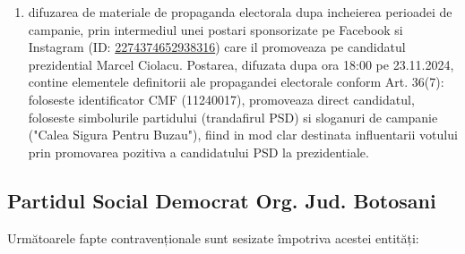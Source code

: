 \documentclass[a4paper,12pt]{article}
\begin{document}
\begin{enumerate}[leftmargin=*, label=\arabic*.)]
    \item difuzarea de materiale de propaganda electorala dupa incheierea perioadei de campanie, prin intermediul unei postari sponsorizate pe Facebook si Instagram (ID: \href{https://www.facebook.com/ads/library/?id=2274374652938316}{2274374652938316}) care il promoveaza pe candidatul prezidential Marcel Ciolacu. Postarea, difuzata dupa ora 18:00 pe 23.11.2024, contine elementele definitorii ale propagandei electorale conform Art. 36(7): foloseste identificator CMF (11240017), promoveaza direct candidatul, foloseste simbolurile partidului (trandafirul PSD) si sloganuri de campanie ("Calea Sigura Pentru Buzau"), fiind in mod clar destinata influentarii votului prin promovarea pozitiva a candidatului PSD la prezidentiale.
\end{enumerate}

\vspace{0.5cm}

\subsection{Partidul Social Democrat Org. Jud. Botosani}
Următoarele fapte contravenționale sunt sesizate împotriva acestei entități:
\end{document}
